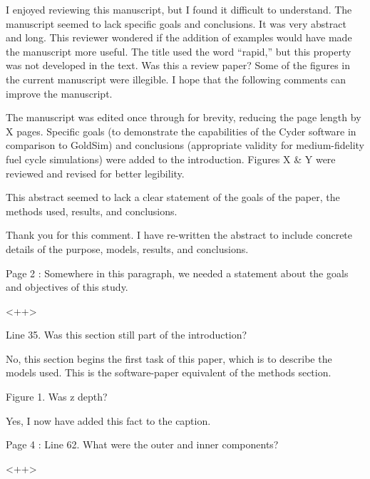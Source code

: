 \documentclass[answers,12pt]{exam}
\begin{document}
\begin{questions}
\question I enjoyed reviewing this manuscript, but I found it difficult to understand.
The manuscript seemed to lack specific goals and conclusions. It was very
abstract and long.  This reviewer wondered if the addition of examples would
have made the manuscript more useful. The title used the word “rapid,” but this
property was not developed in the text. Was this a review paper? Some of the
figures in the current manuscript were illegible. I hope that the following
comments can improve the manuscript.
\begin{solution}
The manuscript was edited once through for brevity, reducing the page length by
X pages. Specific goals (to demonstrate the capabilities of the Cyder software
in comparison to GoldSim) and conclusions (appropriate validity for
medium-fidelity fuel cycle simulations) were added to the introduction. Figures
X \& Y were reviewed and revised for better legibility.
\end{solution}

\question This abstract seemed to lack a clear statement of the goals of the paper, the methods used, results, and conclusions.
\begin{solution}
Thank you for this comment. I have re-written the abstract to include concrete 
details of the purpose, models, results, and conclusions. 
\end{solution}

\question Page 2 : Somewhere in this paragraph, we needed a statement about the goals and objectives of this study.
\begin{solution}
<++>
\end{solution}


\question Line 35. Was this section still part of the introduction?

\begin{solution}
No, this section begins the first task of this paper, which is to describe the 
models used. This is the software-paper equivalent of the methods section.
\end{solution}

\question Figure 1. Was z depth?
\begin{solution}
Yes, I now have added this fact to the caption.
\end{solution}

\question Page 4 : Line 62. What were the outer and inner components?

\begin{solution}
<++>
\end{solution}
 


\end{questions}
\end{document}
